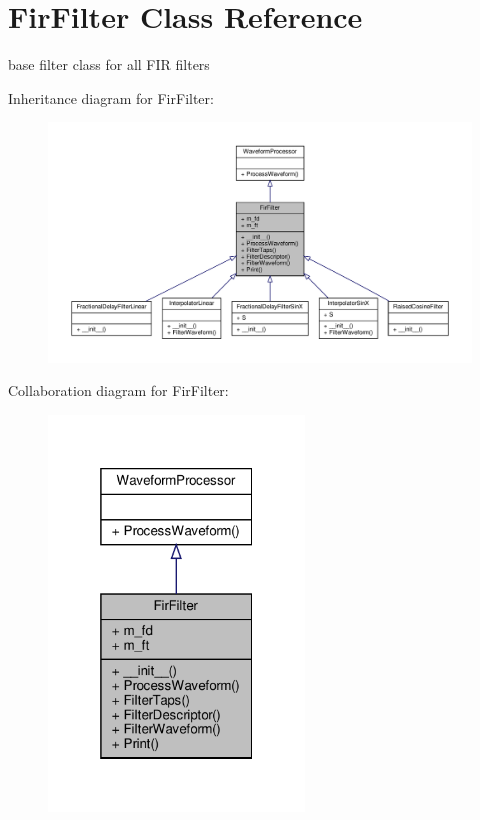 \hypertarget{classSignalIntegrity_1_1TimeDomain_1_1Filters_1_1FirFilter_1_1FirFilter}{}\section{Fir\+Filter Class Reference}
\label{classSignalIntegrity_1_1TimeDomain_1_1Filters_1_1FirFilter_1_1FirFilter}


base filter class for all F\+IR filters  




Inheritance diagram for Fir\+Filter\+:
\nopagebreak
\begin{figure}[H]
\begin{center}
\leavevmode
\includegraphics[width=350pt]{classSignalIntegrity_1_1TimeDomain_1_1Filters_1_1FirFilter_1_1FirFilter__inherit__graph}
\end{center}
\end{figure}


Collaboration diagram for Fir\+Filter\+:
\nopagebreak
\begin{figure}[H]
\begin{center}
\leavevmode
\includegraphics[width=193pt]{classSignalIntegrity_1_1TimeDomain_1_1Filters_1_1FirFilter_1_1FirFilter__coll__graph}
\end{center}
\end{figure}

